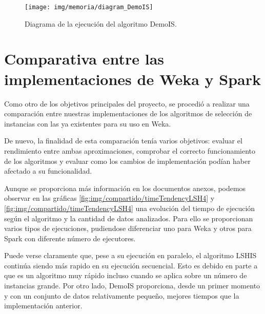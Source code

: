 
	\begin{figure}[!h]
		\centering
		\texttt{[image: img/memoria/diagram\_DemoIS]}
		\caption{Diagrama de la ejecución del algoritmo DemoIS.}\label{fig:img/memoria/diagram_DemoIS}
	\end{figure}
	\FloatBarrier


\section{Comparativa entre las implementaciones de Weka y Spark}

Como otro de los objetivos principales del proyecto, se procedió a realizar una comparación entre nuestras implementaciones de los algoritmos de selección de instancias con las ya existentes para su uso en Weka.

De nuevo, la finalidad de esta comparación tenía varios objetivos: evaluar el rendimiento entre ambas aproximaciones, comprobar el correcto funcionamiento de los algoritmos y evaluar como los cambios de implementación podían haber afectado a su funcionalidad.

Aunque se proporciona más información en los documentos anexos, podemos observar en las gráficas \ref{fig:img/compartido/timeTendencyLSH4} y \ref{fig:img/compartido/timeTendencyLSH4} una evolución del tiempo de ejecución según el algoritmo y la cantidad de datos analizados. Para ello se proporcionan varios tipos de ejecuciones, pudiendose diferenciar uno para Weka y otros para Spark con diferente número de ejecutores.

Puede verse claramente que, pese a su ejecución en paralelo, el algoritmo LSHIS continúa siendo más rapido en su ejecución secuencial. Esto es debido en parte a que es un algoritmo muy rápido incluso cuando se aplica sobre un número de instancias grande. Por otro lado, DemoIS proporciona, desde un primer momento y con un conjunto de datos relativamente pequeño, mejores tiempos que la implementación anterior.

